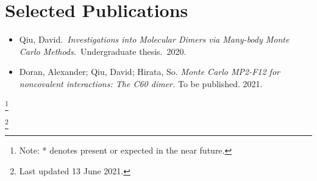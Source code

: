 \documentclass{article}
\begin{document}
\section{Selected Publications}

\begin{itemize}[noitemsep, nolistsep]
	\item Qiu, David.\ \emph{Investigations into Molecular Dimers via
		Many-body Monte Carlo Methods.}\ Undergraduate thesis.\ 2020.

	\item Doran, Alexander; Qiu, David; Hirata, So. \emph{Monte Carlo MP2-F12
		for noncovalent interactions: The C60 dimer.} To be published. 2021.
\end{itemize}

\newcommand\blfootnote[1]{%
	\begingroup
	\renewcommand\thefootnote{}\footnote{#1}%
	\addtocounter{footnote}{-1}%
	\endgroup
}

\blfootnote{Note: * denotes present or expected in the near future.}
\blfootnote{Last updated 13 June 2021.}
\end{document}
